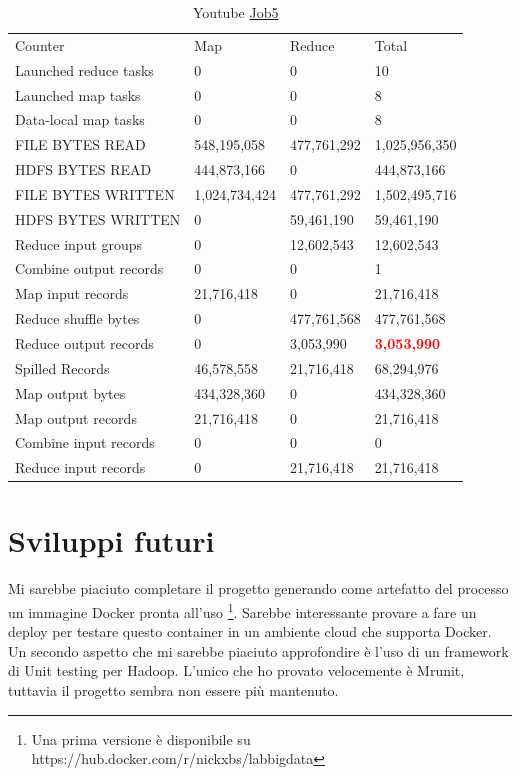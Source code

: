 \documentclass[paper=a4, fontsize=11pt]{scrartcl}	%
\numberwithin{equation}{section}															%
\numberwithin{figure}{section}																%
\numberwithin{table}{section}																%
\begin{document}
\begin{table}[!htbp]
	\centering
	\caption{Youtube \href{http://hadoop-compute0.di.univr.it:50030/jobdetails.jsp?jobid=job_201603141010_12295}{Job5}}
	\label{my-label}
	\begin{tabular}{llll}
		Counter&	Map&	Reduce&	Total\\
		Launched reduce tasks&	0&	0&	10\\
		Launched map tasks&	0&	0&	8\\
		Data-local map tasks&	0&	0&	8\\
		FILE BYTES READ&	548,195,058&	477,761,292&	1,025,956,350\\
		HDFS BYTES READ&	444,873,166&	0&	444,873,166\\
		FILE BYTES WRITTEN&	1,024,734,424&	477,761,292&	1,502,495,716\\
		HDFS BYTES WRITTEN&	0&	59,461,190&	59,461,190\\
		Reduce input groups&	0&	12,602,543&	12,602,543\\
		Combine output records&	0&	0&	1\\
		Map input records&	21,716,418&	0&	21,716,418\\
		Reduce shuffle bytes&	0&	477,761,568&	477,761,568\\
		Reduce output records&	0&	3,053,990&	\textbf{\textcolor{red}{3,053,990}}\\
		Spilled Records&	46,578,558&	21,716,418&	68,294,976\\
		Map output bytes&	434,328,360&	0&	434,328,360\\
		Map output records&	21,716,418&	0&	21,716,418\\
		Combine input records&	0&	0&	0\\
		Reduce input records&	0&	21,716,418&	21,716,418\\
	\end{tabular}
\end{table}
\FloatBarrier
\section{Sviluppi futuri}
Mi sarebbe piaciuto completare il progetto generando come artefatto del processo un immagine Docker pronta all'uso \protect\footnote{Una prima versione è disponibile su https://hub.docker.com/r/nickxbs/labbigdata }. Sarebbe interessante provare a fare un deploy per testare questo container in un ambiente cloud che supporta Docker.\\
Un secondo aspetto che mi sarebbe piaciuto approfondire è l'uso di un framework di Unit testing per Hadoop. L'unico che ho provato velocemente è Mrunit, tuttavia il progetto sembra non essere più mantenuto.
\end{document}
